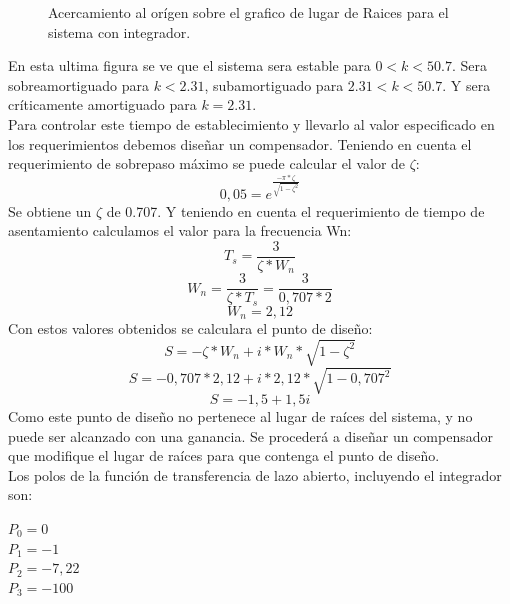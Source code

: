 \documentclass[a4paper,11pt]{article}
\begin{document}
	  \begin{figure}[H] %
	\caption{Acercamiento al orígen sobre el grafico de lugar de Raices para el sistema con integrador.}
	\label{fig:LR3}
	\end{figure} 
	
En esta ultima figura se ve que el sistema sera estable para $0<k<50.7$. Sera sobreamortiguado para $k<2.31$, subamortiguado para $2.31<k<50.7$. Y sera críticamente amortiguado para $k = 2.31$.\\
Para controlar este tiempo de establecimiento y llevarlo al valor especificado en los requerimientos debemos diseñar un compensador. Teniendo en cuenta el requerimiento de sobrepaso máximo se puede calcular el valor de $\zeta$:\\
$$0,05=e^{\frac{-\pi*\zeta}{\sqrt{1-\zeta^{2}}}}$$
Se obtiene un $\zeta$ de 0.707. Y teniendo en cuenta el requerimiento de tiempo de asentamiento calculamos el valor para la frecuencia Wn:
$$T_s=\frac{3}{\zeta*W_n} $$
$$W_n=\frac{3}{\zeta*T_s}=\frac{3}{0,707*2}$$
$$W_n=2,12$$
Con estos valores obtenidos se calculara el punto de diseño:
$$S = - \zeta*W_n + i*W_n*\sqrt{1-\zeta^2}$$
$$S = - 0,707*2,12 + i*2,12*\sqrt{1-0,707^2}$$
$$S = -1,5+1,5i$$
Como este punto de diseño no pertenece al lugar de raíces del sistema, y no puede ser alcanzado con una ganancia. Se procederá a diseñar un compensador que modifique el lugar de raíces para que contenga el punto de diseño.\\
Los polos de la función de transferencia de lazo abierto, incluyendo el integrador son:\\
\begin{center}
$P_0=0$\\
$P_1=-1$\\
$P_2=-7,22$\\
$P_3=-100$\\
\end{center}
\end{document}
